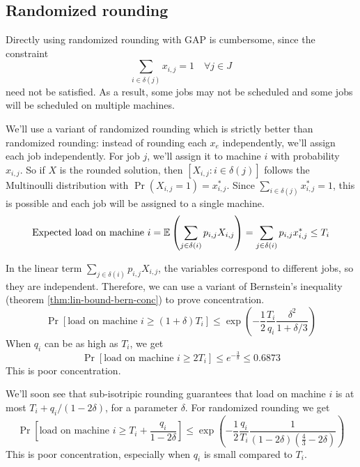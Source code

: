 \subsection{Randomized rounding}

Directly using randomized rounding with GAP is cumbersome, since the constraint
\[ \sum_{i \in \delta(j)} x_{i,j} = 1 \quad \forall j \in J \]
need not be satisfied. As a result, some jobs may not be scheduled
and some jobs will be scheduled on multiple machines.

We'll use a variant of randomized rounding which is strictly better than randomized rounding:
instead of rounding each $x_e$ independently, we'll assign each job independently.
For job $j$, we'll assign it to machine $i$ with probability $x_{i,j}$.
So if $X$ is the rounded solution, then $[X_{i,j}: i \in \delta(j)]$
follows the Multinoulli distribution with $\Pr(X_{i,j} = 1) = x_{i,j}^*$.
Since $\sum_{i \in \delta(j)} x_{i,j}^* = 1$, this is possible and each job
will be assigned to a single machine.
\[ \textrm{Expected load on machine } i
= \operatorname{\mathbb{E}}\left(\sum_{j \in \delta(i)} p_{i,j}X_{i,j}\right)
= \sum_{j \in \delta(i)} p_{i,j}x_{i,j}^*
\le T_i \]

In the linear term $\sum_{j \in \delta(i)} p_{i,j}X_{i,j}$,
the variables correspond to different jobs, so they are independent.
Therefore, we can use a variant of Bernstein's inequality
(theorem \ref{thm:lin-bound-bern-conc}) to prove concentration.
\[ \Pr[\textrm{load on machine } i \ge (1+\delta)T_i]
\le \exp\left( -\frac{1}{2} \frac{T_i}{q_i} \frac{\delta^2}{1+\delta/3} \right) \]
When $q_i$ can be as high as $T_i$, we get
\[ \Pr[\textrm{load on machine } i \ge 2T_i]
\le e^{-\frac{3}{8}} \le 0.6873 \]
This is poor concentration.

We'll soon see that sub-isotripic rounding guarantees that load on machine $i$
is at most $T_i + q_i/(1-2\delta)$, for a parameter $\delta$. For randomized rounding we get
\[ \Pr\left[\textrm{load on machine } i \ge T_i + \frac{q_i}{1-2\delta} \right]
\le \exp\left( -\frac{1}{2} \frac{q_i}{T_i} \frac{1}{(1-2\delta)(\frac{4}{3}-2\delta)}\right) \]
This is poor concentration, especially when $q_i$ is small compared to $T_i$.
